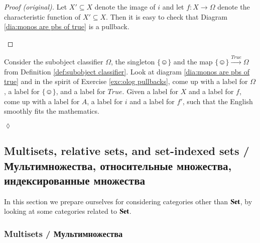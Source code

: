 \documentclass{book}
\def\singleton{\{\smiley\}}
\def\to{\rightarrow}
\def\taking{\colon}
\def\ss{\subseteq}
\newcommand{\To}[1]{\xrightarrow{#1}}
\def\Set{{\bf Set}}
\theoremstyle{theoremENG}
\theoremstyle{lemmaENG}
\theoremstyle{propositionENG}
\theoremstyle{corollaryENG}
\newtheorem{corollaryENG}[subsubsection]{\begin{english}Corollary\end{english}}
\theoremstyle{factENG}
\theoremstyle{remarkENG}
\theoremstyle{exampleENG}
\theoremstyle{warningENG}
\theoremstyle{questionENG}
\theoremstyle{guessENG}
\theoremstyle{answerENG}
\theoremstyle{constructionENG}
\theoremstyle{rulesENG}
\theoremstyle{excENG}
\newtheorem{excENG}[subsubsection]{\begin{english}Exercise\end{english}}
\theoremstyle{appENG}
\theoremstyle{definitionENG}
\theoremstyle{notationENG}
\theoremstyle{conjectureENG}
\theoremstyle{postulateENG}
\newenvironment{proofENG}{\begin{proof}[Proof (original)]}{\end{proof}}
\newenvironment{exerciseENG}{\begin{excENG}}{\hspace*{\fill}$\lozenge$\end{excENG}}
\theoremstyle{theoremRUS}
\theoremstyle{lemmaRUS}
\theoremstyle{propositionRUS}
\theoremstyle{corollaryRUS}
\theoremstyle{factRUS}
\theoremstyle{remarkRUS}
\theoremstyle{exampleRUS}
\theoremstyle{warningRUS}
\theoremstyle{questionRUS}
\theoremstyle{guessRUS}
\theoremstyle{answerRUS}
\theoremstyle{constructionRUS}
\theoremstyle{rulesRUS}
\theoremstyle{excRUS}
\theoremstyle{appRUS}
\theoremstyle{definitionRUS}
\theoremstyle{notationRUS}
\theoremstyle{conjectureRUS}
\theoremstyle{postulateRUS}
\begin{document}
\begin{english}
\begin{corollaryENG}
\begin{russian} \end{russian}

\end{corollaryENG}

\begin{proofENG}

Let $X'\ss X$ denote the image of $i$ and let $f\taking X\to\Omega$ denote the characteristic function of $X'\ss X$. Then it is easy to check that Diagram \ref{dia:monos are pbs of true} is a pullback.

\begin{russian} \end{russian}

\end{proofENG}

\begin{exerciseENG}

Consider the subobject classifier $\Omega$, the singleton $\singleton$ and the map $\singleton\To{True}\Omega$ from Definition \ref{def:subobject classifier}. Look at diagram \ref{dia:monos are pbs of true} and in the spirit of Exercise \ref{exc:olog pullbacks}, come up with a label for $\Omega$, a label for $\singleton$, and a label for $True$. Given a label for $X$ and a label for $f$, come up with a label for $A$, a label for $i$ and a label for $f'$, such that the English smoothly fits the mathematics.

\begin{russian} \end{russian}

\end{exerciseENG}


\subsection{Multisets, relative sets, and set-indexed sets / Мультимножества, относительные множества, индексированные множества}

In this section we prepare ourselves for considering categories other than $\Set$, by looking at some categories related to $\Set$. 

\begin{russian} \end{russian}


\subsubsection{Multisets / Мультимножества}


\end{english}
\end{document}
